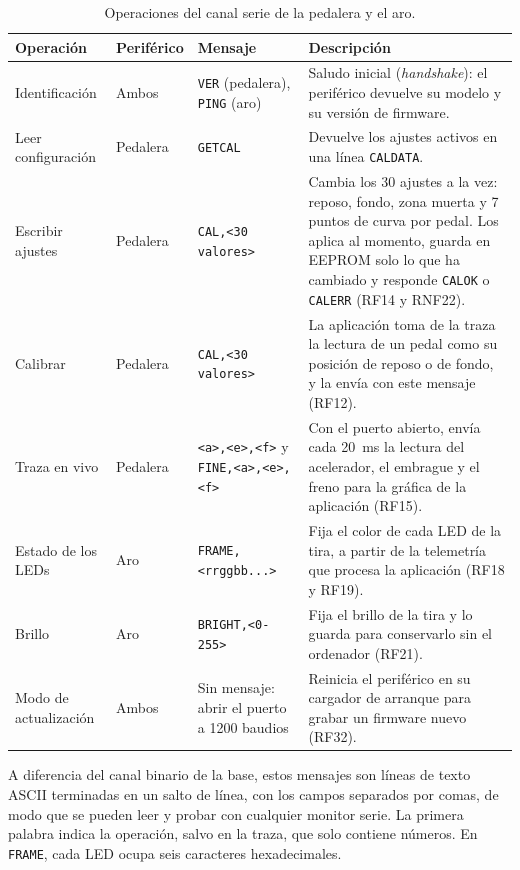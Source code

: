 \begin{table}[H]
	\centering
	\caption{Operaciones del canal serie de la pedalera y el aro.}
	\label{tab:comandos-serie}
	\small
	\begin{tabularx}{\textwidth}{@{}>{\raggedright\arraybackslash}p{2.4cm}>{\raggedright\arraybackslash}p{1.5cm}>{\raggedright\arraybackslash}p{3.6cm}X@{}}
		\toprule
		\textbf{Operación} & \textbf{Periférico} & \textbf{Mensaje} & \textbf{Descripción} \\
		\midrule
		Identificación & Ambos & \texttt{VER} (pedalera), \texttt{PING} (aro) & Saludo inicial (\textit{handshake}): el periférico devuelve su modelo y su versión de firmware. \\
		Leer configuración & Pedalera & \texttt{GETCAL} & Devuelve los ajustes activos en una línea \texttt{CALDATA}. \\
		Escribir ajustes & Pedalera & \texttt{CAL,<30 valores>} & Cambia los 30 ajustes a la vez: reposo, fondo, zona muerta y 7 puntos de curva por pedal. Los aplica al momento, guarda en EEPROM solo lo que ha cambiado y responde \texttt{CALOK} o \texttt{CALERR} (RF14 y RNF22). \\
		Calibrar & Pedalera & \texttt{CAL,<30 valores>} & La aplicación toma de la traza la lectura de un pedal como su posición de reposo o de fondo, y la envía con este mensaje (RF12). \\
		Traza en vivo & Pedalera & \texttt{<a>,<e>,<f>} y \texttt{FINE,<a>,<e>,<f>} & Con el puerto abierto, envía cada 20~ms la lectura del acelerador, el embrague y el freno para la gráfica de la aplicación (RF15). \\
		Estado de los LEDs & Aro & \texttt{FRAME,<rrggbb...>} & Fija el color de cada LED de la tira, a partir de la telemetría que procesa la aplicación (RF18 y RF19). \\
		Brillo & Aro & \texttt{BRIGHT,<0-255>} & Fija el brillo de la tira y lo guarda para conservarlo sin el ordenador (RF21). \\
		Modo de actualización & Ambos & Sin mensaje: abrir el puerto a 1200 baudios & Reinicia el periférico en su cargador de arranque para grabar un firmware nuevo (RF32). \\
		\bottomrule
	\end{tabularx}
\end{table}

A diferencia del canal binario de la base, estos mensajes son líneas de texto ASCII terminadas en un salto de línea, con los campos separados por comas, de modo que se pueden leer y probar con cualquier monitor serie. La primera palabra indica la operación, salvo en la traza, que solo contiene números. En \texttt{FRAME}, cada LED ocupa seis caracteres hexadecimales.

